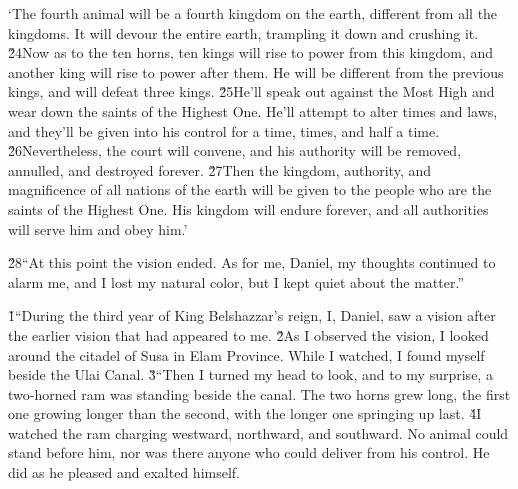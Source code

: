 \begin{poetry}
\poeml `The fourth animal will be a fourth kingdom on the earth, different from all the kingdoms. It will devour the entire earth, trampling it down and crushing it. \v{24}Now as to the ten horns, ten kings will rise to power from this kingdom, and another king will rise to power after them. He will be different from the previous kings, and will defeat three kings. \v{25}He'll speak out against the Most High and wear down the saints of the Highest One. He'll attempt to alter times and laws, and they'll be given into his control for a time, times, and half a time. \v{26}Nevertheless, the court will convene, and his authority will be removed, annulled, and destroyed forever. \v{27}Then the kingdom, authority, and magnificence of all nations of the earth will be given to the people who are the saints of the Highest One. His kingdom will endure forever, and all authorities will serve him and obey him.'
\end{poetry}

\v{28}``At this point the vision ended. As for me, Daniel, my thoughts continued to alarm me, and I lost my natural color, but I kept quiet about the matter.''

\v{1}``During the third year of King Belshazzar's reign, I, Daniel, saw a vision after the earlier vision that had appeared to me. \v{2}As I observed the vision, I looked around the citadel of Susa in Elam Province. While I watched, I found myself beside the Ulai Canal. \v{3}``Then I turned my head to look, and to my surprise, a two-horned ram was standing beside the canal. The two horns grew long, the first one growing longer than the second, with the longer one springing up last. \v{4}I watched the ram charging westward, northward, and southward. No animal could stand before him, nor was there anyone who could deliver from his control. He did as he pleased and exalted himself.

